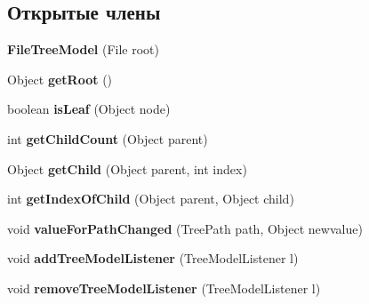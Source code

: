 \subsection*{Открытые члены}
\begin{DoxyCompactItemize}
\item 
\hypertarget{classorg_1_1fstree_1_1_file_tree_model_a1a57adcf3fea10e5a1b6909d302c921f}{
{\bfseries FileTreeModel} (File root)}
\label{classorg_1_1fstree_1_1_file_tree_model_a1a57adcf3fea10e5a1b6909d302c921f}

\item 
\hypertarget{classorg_1_1fstree_1_1_file_tree_model_a6445b487a81c2e9146ca5a9e45f91a43}{
Object {\bfseries getRoot} ()}
\label{classorg_1_1fstree_1_1_file_tree_model_a6445b487a81c2e9146ca5a9e45f91a43}

\item 
\hypertarget{classorg_1_1fstree_1_1_file_tree_model_a1401d057874c0643ab77fa80448f185c}{
boolean {\bfseries isLeaf} (Object node)}
\label{classorg_1_1fstree_1_1_file_tree_model_a1401d057874c0643ab77fa80448f185c}

\item 
\hypertarget{classorg_1_1fstree_1_1_file_tree_model_a81cc2717f0a87d054977f69d8fe20bff}{
int {\bfseries getChildCount} (Object parent)}
\label{classorg_1_1fstree_1_1_file_tree_model_a81cc2717f0a87d054977f69d8fe20bff}

\item 
\hypertarget{classorg_1_1fstree_1_1_file_tree_model_ae6886dbfa3fcab740bd90286d62aa996}{
Object {\bfseries getChild} (Object parent, int index)}
\label{classorg_1_1fstree_1_1_file_tree_model_ae6886dbfa3fcab740bd90286d62aa996}

\item 
\hypertarget{classorg_1_1fstree_1_1_file_tree_model_a8d2e9e54f399176e80d68a9047d0168f}{
int {\bfseries getIndexOfChild} (Object parent, Object child)}
\label{classorg_1_1fstree_1_1_file_tree_model_a8d2e9e54f399176e80d68a9047d0168f}

\item 
\hypertarget{classorg_1_1fstree_1_1_file_tree_model_a330608e13286964093e0e2af44e25dd5}{
void {\bfseries valueForPathChanged} (TreePath path, Object newvalue)}
\label{classorg_1_1fstree_1_1_file_tree_model_a330608e13286964093e0e2af44e25dd5}

\item 
\hypertarget{classorg_1_1fstree_1_1_file_tree_model_a5797bce2b0bb1a27e2adf4c1adb0ae56}{
void {\bfseries addTreeModelListener} (TreeModelListener l)}
\label{classorg_1_1fstree_1_1_file_tree_model_a5797bce2b0bb1a27e2adf4c1adb0ae56}

\item 
\hypertarget{classorg_1_1fstree_1_1_file_tree_model_a6888697713f72ece18dfd67e851f4d48}{
void {\bfseries removeTreeModelListener} (TreeModelListener l)}
\label{classorg_1_1fstree_1_1_file_tree_model_a6888697713f72ece18dfd67e851f4d48}

\end{DoxyCompactItemize}
